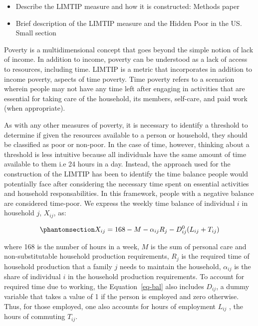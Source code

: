 \documentclass[
  11pt,
]{article}
\providecommand{\tightlist}{%
  \setlength{\itemsep}{0pt}\setlength{\parskip}{0pt}}\usepackage{longtable,booktabs,array}
\begin{document}
\begin{itemize}
\tightlist
\item
  Describe the LIMTIP measure and how it is constructed: Methods paper
\item
  Brief description of the LIMTIP measure and the Hidden Poor in the US.
  Small section
\end{itemize}

Poverty is a multidimensional concept that goes beyond the simple notion
of lack of income. In addition to income, poverty can be understood as a
lack of access to resources, including time. LIMTIP is a metric that
incorporates in addition to income poverty, aspects of time poverty.
Time poverty refers to a scenarion wherein people may not have any time
left after engaging in activities that are essential for taking care of
the household, its members, self-care, and paid work (when appropriate).

As with any other measures of poverty, it is necessary to identify a
threshold to determine if given the resources available to a person or
household, they should be classified as poor or non-poor. In the case of
time, however, thinking about a threshold is less intuitive because all
individuals have the same amount of time available to them i.e 24 hours
in a day. Instead, the approach used for the construction of the LIMTIP
has been to identify the time balance people would potentially face
after considering the necessary time spent on essential activities and
household responsabilities. In this framework, people with a negative
balance are considered time-poor. We express the weekly time balance of
individual \(i\) in household \(j\), \(X_{ij}\), as:

\begin{equation}\phantomsection\label{eq-bal}{X_{ij} = 168 - M - \alpha_{ij}R_j-D_{ij}^0(L_{ij}+T_{ij})
}\end{equation}

where 168 is the number of hours in a week, \(M\) is the sum of personal
care and non-substitutable household production requirements, \(R_j\) is
the required time of household production that a family \(j\) needs to
maintain the household, \(\alpha_{ij}\) is the share of individual \(i\)
in the household production requirements. To account for required time
due to working, the Equation~\ref{eq-bal} also includes \(D_{ij}\), a
dummy variable that takes a value of 1 if the person is employed and
zero otherwise. Thus, for those employed, one also accounts for hours of
employment \(L_{ij}\) , the hours of commuting \(T_{ij}\).
\end{document}
